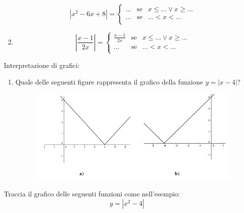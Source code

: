 \begin{enumerate}
$$        |x^2-6x+8|=
        \left\lbrace 
        \begin{array}{lcl}
        \dots & \text{se}& x\leq\dots \vee x\geq\dots\\
        \dots & \text{se}& \dots <x<\dots\\
        \end{array}
        \right.
        $$
        \item 
        $$
        |\frac{x-1}{2x}|=
        \left\lbrace 
        \begin{array}{lcl}
        \frac{x-1}{2x} & \text{se}& x\leq\dots \vee x\geq\dots\\
        \dots & \text{se}& \dots <x<\dots\\
        \end{array}
        \right.
        $$
\end{enumerate}
Interpretazione di grafici:
\begin{enumerate}
\item Quale delle seguenti figure rappresenta il grafico della funzione 
$y=|x-4|$?

\begin{figure}[h]
\begin{inaccessibleblock}[TODO]
\centering
\includegraphics[width=0.9\linewidth]{img/imm6} %
\end{inaccessibleblock}
\label{fig:abs_imm6}
\end{figure}
\end{enumerate}
Traccia il grafico delle seguenti funzioni come nell'esempio:
$$y=|x^2-4|$$
